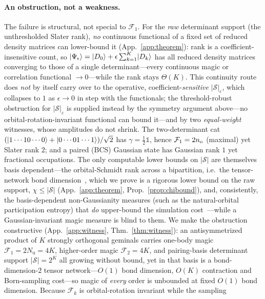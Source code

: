 \paragraph{An obstruction, not a weakness.} The failure is structural, not special to $\mathcal F_1$.
For the \emph{raw} determinant support (the unthresholded Slater rank), \emph{no} continuous functional
of a fixed set of reduced density matrices can lower-bound it (App.~\ref{app:theorem}): rank is a
coefficient-insensitive count, so $\lvert \Psi_\epsilon \rangle=\lvert D_0 \rangle+\epsilon\sum_{k=1}^{K}\lvert D_k \rangle$ has all
reduced density matrices converging to those of a single determinant---every continuous magic or
correlation functional $\to0$---while the rank stays $\Theta(K)$. This continuity route does \emph{not}
by itself carry over to the operative, coefficient-\emph{sensitive} $|\mathcal S|_\varepsilon$, which
collapses to $1$ as $\epsilon\to0$ in step with the functionals; the threshold-robust obstruction for
$|\mathcal S|_\varepsilon$ is supplied instead by the symmetry argument above---no
orbital-rotation-invariant functional can bound it---and by two \emph{equal-weight} witnesses, whose
amplitudes do not shrink. The two-determinant cat $(\lvert 1\cdots10\cdots0 \rangle+\lvert 0\cdots01\cdots1 \rangle)/\sqrt2$
has $\gamma=\tfrac12\mathbb 1$, hence $\mathcal F_1=2n_{\rm o}$ (maximal) yet Slater rank $2$; and a paired (BCS)
Gaussian state has Gaussian rank $1$ yet fractional occupations. The only computable lower bounds on $|\mathcal S|$ are themselves
basis dependent---the orbital-Schmidt rank across a bipartition, i.e.\ the tensor-network bond
dimension~\cite{schollwock2011}, which we prove is a rigorous lower bound on the raw support,
$\chi\le|\mathcal S|$ (App.~\ref{app:theorem}, Prop.~\ref{prop:chibound}), and, consistently, the basis-dependent non-Gaussianity measures
(such as the natural-orbital participation entropy) that \emph{do} upper-bound the simulation
cost~\cite{tarabunga2026}---while a Gaussian-invariant magic measure is blind to them. We make the
obstruction constructive (App.~\ref{app:witness}, Thm.~\ref{thm:witness}): an antisymmetrized product of
$K$ strongly orthogonal geminals carries one-body magic $\mathcal F_1=2N_{\mathrm u}=4K$, higher-order
magic $\mathcal F_2=4K$, and pairing-basis determinant support $|\mathcal S|=2^{K}$ all growing without
bound, yet in that basis is a bond-dimension-$2$ tensor network---$O(1)$ bond dimension, $O(K)$
contraction and Born-sampling cost---so magic of \emph{every} order is unbounded at fixed $O(1)$ bond dimension. Because $\mathcal F_k$ is orbital-rotation invariant while the sampling
